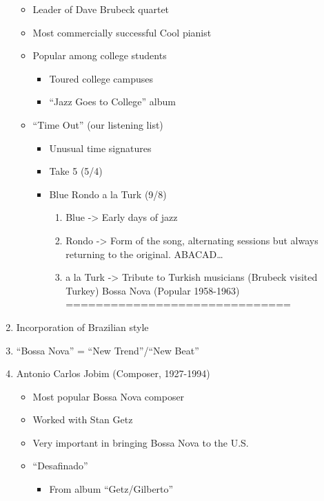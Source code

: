 \documentclass[]{article}
\providecommand{\tightlist}{%
  \setlength{\itemsep}{0pt}\setlength{\parskip}{0pt}}
\begin{document}
\begin{enumerate}
  \begin{itemize}
  \tightlist
  \item
    Leader of Dave Brubeck quartet
  \item
    Most commercially successful Cool pianist
  \item
    Popular among college students

    \begin{itemize}
    \tightlist
    \item
      Toured college campuses
    \item
      ``Jazz Goes to College'' album
    \end{itemize}
  \item
    ``Time Out'' (our listening list)

    \begin{itemize}
    \tightlist
    \item
      Unusual time signatures
    \item
      Take 5 (5/4)
    \item
      Blue Rondo a la Turk (9/8)

      \begin{enumerate}
      \def\labelenumii{\roman{enumii}.}
      \tightlist
      \item
        Blue -\textgreater{} Early days of jazz
      \item
        Rondo -\textgreater{} Form of the song, alternating sessions but
        always returning to the original. ABACAD\ldots{}
      \item
        a la Turk -\textgreater{} Tribute to Turkish musicians (Brubeck
        visited Turkey) Bossa Nova (Popular 1958-1963)
        ==============================
      \end{enumerate}
    \end{itemize}
  \end{itemize}
\item
  Incorporation of Brazilian style
\item
  ``Bossa Nova'' = ``New Trend''/``New Beat''
\item
  Antonio Carlos Jobim (Composer, 1927-1994)

  \begin{itemize}
  \tightlist
  \item
    Most popular Bossa Nova composer
  \item
    Worked with Stan Getz
  \item
    Very important in bringing Bossa Nova to the U.S.
  \item
    ``Desafinado''

    \begin{itemize}
    \tightlist
    \item
      From album ``Getz/Gilberto''
    \end{itemize}
  \end{itemize}
\end{enumerate}
\end{document}
